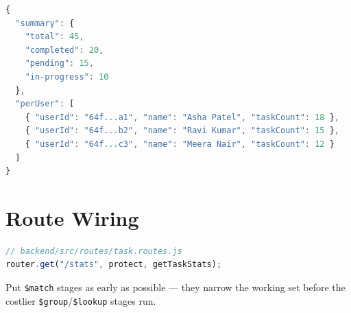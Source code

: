 \begin{lstlisting}[language=JavaScript]
{
  "summary": {
    "total": 45,
    "completed": 20,
    "pending": 15,
    "in-progress": 10
  },
  "perUser": [
    { "userId": "64f...a1", "name": "Asha Patel", "taskCount": 18 },
    { "userId": "64f...b2", "name": "Ravi Kumar", "taskCount": 15 },
    { "userId": "64f...c3", "name": "Meera Nair", "taskCount": 12 }
  ]
}
\end{lstlisting}

\section{Route Wiring}

\begin{lstlisting}[language=JavaScript]
// backend/src/routes/task.routes.js
router.get("/stats", protect, getTaskStats);
\end{lstlisting}

\begin{tipbox}[TIP]
Put \texttt{\$match} stages as early as possible --- they narrow the working
set before the costlier \texttt{\$group}/\texttt{\$lookup} stages run.
\end{tipbox}
